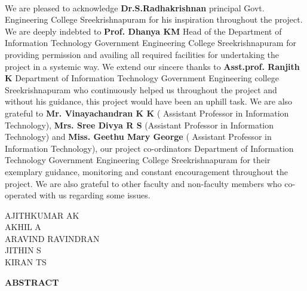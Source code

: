 \documentclass[10pt,a4paper,twoside]{report}
\newcommand\blankpage{
	\null
	\thispagestyle{empty}
	\addtocounter{page}{-1}
	\newpage}
\begin{document}
\paragraph{ }
We are pleased to acknowledge \textbf{Dr.S.Radhakrishnan} principal Govt. Engineering College Sreekrishnapuram for his inspiration throughout the project. We are deeply indebted to \textbf{Prof. Dhanya KM} Head of the Department of Information Technology Government Engineering College Sreekrishnapuram for providing permission and availing all required facilities for undertaking the project in a systemic way. We extend our sincere thanks to \textbf{Asst.prof. Ranjith K} Department of Information Technology Government Engineering college Sreekrishnapuram  who continuously helped us throughout the project and without his guidance, this project would have been an uphill task. We are also grateful to \textbf{Mr. Vinayachandran K K} ( Assistant Professor in Information Technology), \textbf{Mrs.
Sree Divya R S} (Assistant Professor in Information Technology) and  \textbf{Miss. Geethu Mary George} ( Assistant Professor in Information Technology), our project co-ordinators Department of Information Technology Government Engineering College Sreekrishnapuram for their exemplary guidance, monitoring and constant encouragement throughout the project. We are also grateful to other faculty and non-faculty members who co-operated with us regarding some issues.
\begin{flushright}
AJITHKUMAR AK\\
AKHIL A\\
ARAVIND RAVINDRAN\\
JITHIN S\\
KIRAN TS
\end{flushright}
\newpage
{}
\setcounter{page}{0}
\newpage
{}
\blankpage
\begin{center}
\begin{Large}
\textbf{ABSTRACT}
\end{Large}
\end{center}
\end{document}
